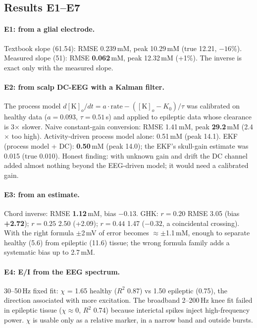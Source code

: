 \subsection{Results E1--E7}

\paragraph{E1: \Kp{} from a glial electrode.} Textbook slope (61.54): RMSE 0.239\,mM, peak 10.29\,mM (true 12.21, $-16$\%). Measured slope (51): RMSE \textbf{0.062}\,mM, peak 12.32\,mM (+1\%). The inverse is exact only with the measured slope.

\paragraph{E2: \Kp{} from scalp DC-EEG with a Kalman filter.} The process model $d[\mathrm K]_o/dt = a\cdot\mathrm{rate} - ([\mathrm K]_o - K_0)/\tau$ was calibrated on healthy data ($a=0.093$, $\tau=0.51$\,s) and applied to epileptic data whose clearance is 3$\times$ slower. Naive constant-gain conversion: RMSE 1.41\,mM, peak \textbf{29.2}\,mM (2.4$\times$ too high). Activity-driven process model alone: 0.51\,mM (peak 14.1). EKF (process model + DC): \textbf{0.50}\,mM (peak 14.0); the EKF's skull-gain estimate was 0.015 (true 0.010). Honest finding: with unknown gain and drift the DC channel added almost nothing beyond the EEG-driven model; it would need a calibrated gain.

\paragraph{E3: \Cli{} from an \EGABA{} estimate.} Chord inverse: RMSE \textbf{1.12}\,mM, bias $-0.13$. GHK: $r=0.20$ RMSE 3.05 (bias \textbf{+2.72}); $r=0.25$ 2.50 (+2.09); $r=0.44$ 1.47 ($-0.32$, a coincidental crossing). With the right formula $\pm$2\,mV of \EGABA{} error becomes $\approx\pm$1.1\,mM, enough to separate healthy (5.6) from epileptic (11.6) tissue; the wrong formula family adds a systematic bias up to 2.7\,mM.

\paragraph{E4: E/I from the EEG spectrum.} 30--50\,Hz fixed fit: $\chi$ = 1.65 healthy ($R^2$ 0.87) vs 1.50 epileptic (0.75), the direction associated with more excitation. The broadband 2--200\,Hz knee fit failed in epileptic tissue ($\chi\approx0$, $R^2$ 0.74) because interictal spikes inject high-frequency power. $\chi$ is usable only as a relative marker, in a narrow band and outside bursts.

